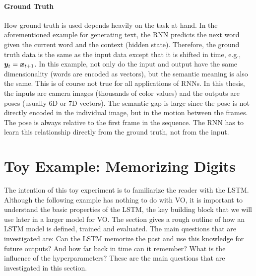 		\paragraph{Ground Truth}
		How ground truth is used depends heavily on the task at hand.
		In the aforementioned example for generating text, the RNN predicts the next word given the current word and the context (hidden state).
		Therefore, the ground truth data is the same as the input data except that it is shifted in time, e.g., $\bm{y}_t = \bm{x}_{t + 1}$.
		In this example, not only do the input and output have the same dimensionality (words are encoded as vectors), but the semantic meaning is also the same.
		This is of course not true for all applications of RNNs.
		In this thesis, the inputs are camera images (thousands of color values) and the outputs are poses (usually 6D or 7D vectors).
		The semantic gap is large since the pose is not directly encoded in the individual image, but in the motion between the frames.
		The pose is always relative to the first frame in the sequence.
		The RNN has to learn this relationship directly from the ground truth, not from the input.

	\section{Toy Example: Memorizing Digits}\label{sec:toy-example-memory}
		
		
		
		The intention of this toy experiment is to familiarize the reader with the LSTM.
		Although the following example has nothing to do with VO, it is important to understand the basic properties of the LSTM, the key building block that we will use later in a larger model for VO.
		The section gives a rough outline of how an LSTM model is defined, trained and evaluated.
		The main questions that are investigated are:
		Can the LSTM memorize the past and use this knowledge for future outputs?
		And how far back in time can it remember?
		What is the influence of the hyperparameters?
		These are the main questions that are investigated in this section.
		
